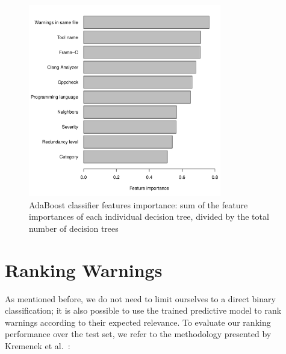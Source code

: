 \begin{figure}
\centering
\includegraphics[width=0.75\textwidth]{figures/importance.pdf}
  \caption{AdaBoost classifier features importance: sum of the feature importances of each individual decision tree, divided by the total number of decision trees}\label{fig:feature_importance}
\end{figure}

\section{Ranking Warnings}
\label{sec:results_ranking}

As mentioned before, we do not need to limit ourselves to a direct binary
classification; it is also possible to use the trained predictive model to rank
warnings according to their expected relevance. To evaluate our ranking
performance over the test set, we refer to the methodology presented by
Kremenek et al.~\cite{kremenek2004correlation}:

